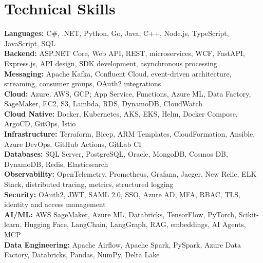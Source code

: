 \documentclass[letterpaper,10.5pt]{article}
\begin{document}
\section{Technical Skills}
\begin{itemize}[leftmargin=0.15in, label={}]
\small{\item{
\textbf{Languages:} C\#, .NET, Python, Go, Java, C++, Node.js, TypeScript, JavaScript, SQL \\
\textbf{Backend:} ASP.NET Core, Web API, REST, microservices, WCF, FastAPI, Express.js, API design, SDK development, asynchronous processing \\
\textbf{Messaging:} Apache Kafka, Confluent Cloud, event-driven architecture, streaming, consumer groups, OAuth2 integrations \\
\textbf{Cloud:} Azure, AWS, GCP; App Service, Functions, Azure ML, Data Factory, SageMaker, EC2, S3, Lambda, RDS, DynamoDB, CloudWatch \\
\textbf{Cloud Native:} Docker, Kubernetes, AKS, EKS, Helm, Docker Compose, ArgoCD, GitOps, Istio \\
\textbf{Infrastructure:} Terraform, Bicep, ARM Templates, CloudFormation, Ansible, Azure DevOps, GitHub Actions, GitLab CI \\
\textbf{Databases:} SQL Server, PostgreSQL, Oracle, MongoDB, Cosmos DB, DynamoDB, Redis, Elasticsearch \\
\textbf{Observability:} OpenTelemetry, Prometheus, Grafana, Jaeger, New Relic, ELK Stack, distributed tracing, metrics, structured logging \\
\textbf{Security:} OAuth2, JWT, SAML 2.0, SSO, Azure AD, MFA, RBAC, TLS, identity and access management \\
\textbf{AI/ML:} AWS SageMaker, Azure ML, Databricks, TensorFlow, PyTorch, Scikit-learn, Hugging Face, LangChain, LangGraph, RAG, embeddings, AI Agents, MCP \\
\textbf{Data Engineering:} Apache Airflow, Apache Spark, PySpark, Azure Data Factory, Databricks, Pandas, NumPy, Delta Lake
}}
\end{itemize}

\end{document}
